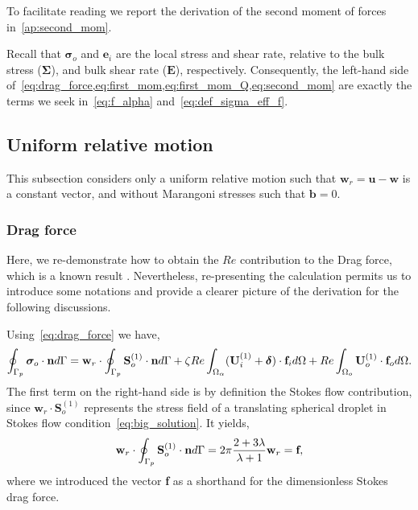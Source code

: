 To facilitate reading we report the derivation of the second moment of forces in~\ref{ap:second_mom}. 


Recall that $\bm\sigma_o$ and $\textbf{e}_i$ are the local stress and shear rate, relative to the bulk stress ($\bm\Sigma$), and bulk shear rate ($\textbf{E}$), respectively. 
Consequently, the left-hand side of~\ref{eq:drag_force,eq:first_mom,eq:first_mom_Q,eq:second_mom} are exactly the terms we seek in~\ref{eq:f_alpha} and~\ref{eq:def_sigma_eff_f}. 

\subsection{Uniform relative motion}

This subsection considers only a uniform relative motion such that $\textbf{w}_r= \textbf{u}-\textbf{w}$ is a constant vector, and without Marangoni stresses such that $\textbf{b}=0$.

\subsubsection{Drag force}

Here, we re-demonstrate how to obtain the $Re$ contribution to the Drag force, which is a known result \citep{proudman1957expansions, stone2001inertial}. 
Nevertheless, re-presenting the calculation permits us to introduce some notations and provide a clearer picture of the derivation for the following discussions. 

Using~\ref{eq:drag_force} we have, 
\begin{equation}
    \intS[p]{\bm\sigma_{o}\cdot \textbf{n}}
    =
    \textbf{w}_{r}\cdot \intS[p]{ \textbf{S}_{o}^{(1)}\cdot \textbf{n}}
    + \zeta Re \intO{(\textbf{U}_{i}^{(1)} + \bm\delta)\cdot \textbf{f}_{i}} 
    + Re\intO[o]{\textbf{U}_{o}^{(1)}\cdot \textbf{f}_{o}}. 
    \label{eq:drag_force_application}
\end{equation}
The first term on the right-hand side is by definition the Stokes flow contribution, since $\textbf{w}_{r}\cdot \textbf{S}_{o}^{(1)}$ represents the stress field of a translating spherical droplet in Stokes flow condition~\eqref{eq:big_solution}. 
It yields, 
\begin{equation}
    \textbf{w}_{r}\cdot\intS[p]{ \textbf{S}_{o}^{(1)}\cdot \textbf{n}}
    = 2 \pi \frac{2+3\lambda}{\lambda+1} \textbf{w}_r
    =\textbf{f},
    \label{eq:stokes_force}
\end{equation}
where we introduced the vector \textbf{f} as a shorthand for the dimensionless Stokes drag force. 

